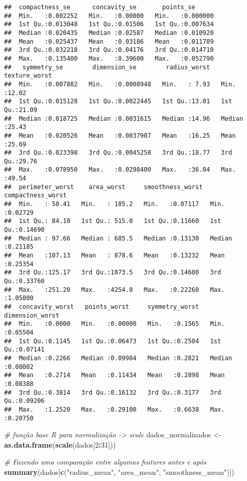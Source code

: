 \documentclass[]{article}
\newenvironment{Shaded}{\begin{snugshade}}{\end{snugshade}}
\newcommand{\KeywordTok}[1]{\textcolor[rgb]{0.13,0.29,0.53}{\textbf{#1}}}
\newcommand{\DecValTok}[1]{\textcolor[rgb]{0.00,0.00,0.81}{#1}}
\newcommand{\StringTok}[1]{\textcolor[rgb]{0.31,0.60,0.02}{#1}}
\newcommand{\CommentTok}[1]{\textcolor[rgb]{0.56,0.35,0.01}{\textit{#1}}}
\newcommand{\OperatorTok}[1]{\textcolor[rgb]{0.81,0.36,0.00}{\textbf{#1}}}
\newcommand{\NormalTok}[1]{#1}
\begin{document}
\begin{verbatim}
##  compactness_se      concavity_se       points_se       
##  Min.   :0.002252   Min.   :0.00000   Min.   :0.000000  
##  1st Qu.:0.013048   1st Qu.:0.01506   1st Qu.:0.007634  
##  Median :0.020435   Median :0.02587   Median :0.010920  
##  Mean   :0.025437   Mean   :0.03186   Mean   :0.011789  
##  3rd Qu.:0.032218   3rd Qu.:0.04176   3rd Qu.:0.014710  
##  Max.   :0.135400   Max.   :0.39600   Max.   :0.052790  
##   symmetry_se        dimension_se        radius_worst   texture_worst  
##  Min.   :0.007882   Min.   :0.0008948   Min.   : 7.93   Min.   :12.02  
##  1st Qu.:0.015128   1st Qu.:0.0022445   1st Qu.:13.01   1st Qu.:21.09  
##  Median :0.018725   Median :0.0031615   Median :14.96   Median :25.43  
##  Mean   :0.020526   Mean   :0.0037907   Mean   :16.25   Mean   :25.69  
##  3rd Qu.:0.023398   3rd Qu.:0.0045258   3rd Qu.:18.77   3rd Qu.:29.76  
##  Max.   :0.078950   Max.   :0.0298400   Max.   :36.04   Max.   :49.54  
##  perimeter_worst    area_worst     smoothness_worst  compactness_worst
##  Min.   : 50.41   Min.   : 185.2   Min.   :0.07117   Min.   :0.02729  
##  1st Qu.: 84.10   1st Qu.: 515.0   1st Qu.:0.11660   1st Qu.:0.14690  
##  Median : 97.66   Median : 685.5   Median :0.13130   Median :0.21185  
##  Mean   :107.13   Mean   : 878.6   Mean   :0.13232   Mean   :0.25354  
##  3rd Qu.:125.17   3rd Qu.:1073.5   3rd Qu.:0.14600   3rd Qu.:0.33760  
##  Max.   :251.20   Max.   :4254.0   Max.   :0.22260   Max.   :1.05800  
##  concavity_worst   points_worst     symmetry_worst   dimension_worst  
##  Min.   :0.0000   Min.   :0.00000   Min.   :0.1565   Min.   :0.05504  
##  1st Qu.:0.1145   1st Qu.:0.06473   1st Qu.:0.2504   1st Qu.:0.07141  
##  Median :0.2266   Median :0.09984   Median :0.2821   Median :0.08002  
##  Mean   :0.2714   Mean   :0.11434   Mean   :0.2898   Mean   :0.08388  
##  3rd Qu.:0.3814   3rd Qu.:0.16132   3rd Qu.:0.3177   3rd Qu.:0.09206  
##  Max.   :1.2520   Max.   :0.29100   Max.   :0.6638   Max.   :0.20750
\end{verbatim}

\begin{Shaded}
\begin{Highlighting}[]
\CommentTok{# função base R para normalização -> scale}
\NormalTok{dados_normalizados <-}\StringTok{ }\KeywordTok{as.data.frame}\NormalTok{(}\KeywordTok{scale}\NormalTok{(dados[}\DecValTok{2}\OperatorTok{:}\DecValTok{31}\NormalTok{]))}

\CommentTok{# Fazendo uma comparação entre algumas features antes e após}
\KeywordTok{summary}\NormalTok{(dados[}\KeywordTok{c}\NormalTok{(}\StringTok{"radius_mean"}\NormalTok{, }\StringTok{"area_mean"}\NormalTok{, }\StringTok{"smoothness_mean"}\NormalTok{)])}
\end{Highlighting}
\end{Shaded}
\end{document}
